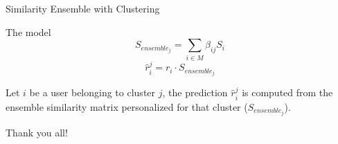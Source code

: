 \documentclass{beamer}
\begin{document}
  \begin{frame}{Similarity Ensemble with Clustering}
  \begin{block}{The model}
  $$
  S_{ensemble_j} = \sum_{i \in M} \beta_{ij} S_i
  $$
  $$
  \hat{r}_i^{j}= r_i \cdot S_{ensemble_j} 
  $$
  \end{block}  
  Let $i$ be a user belonging to cluster $j$, the prediction $\hat{r}_i^{j}$ is computed from the ensemble similarity matrix personalized for that cluster ($S_{ensemble _j}$). 
  \end{frame}
  \begin{frame}[standout]
  Thank you all!
  \end{frame}
\end{document}
